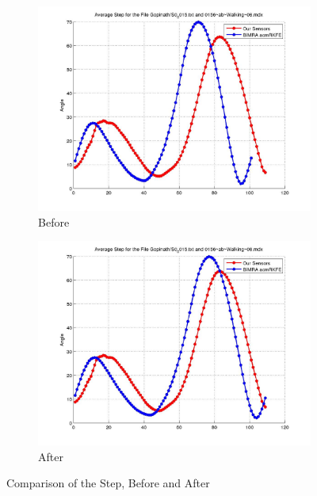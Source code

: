 \documentclass[12pt]{article}
\begin{document}
\begin{figure}[h]%

\begin{subfigure}[!htb]{2cm}
\hspace*{-2cm} \includegraphics[scale=.22]{S0_0015_before_acmrkfe.jpg}
\caption{Before}
\end{subfigure}
\hfill\hfill
\begin{subfigure}[h]{0.4\textwidth}
\hspace*{-2cm} \includegraphics[scale=.22]{S0_0015_after_acmrkfe.jpg}
\caption{After}
\end{subfigure}%

\caption[Hello]{Comparison of the Step, Before and After}
\end{figure}
\end{document}
